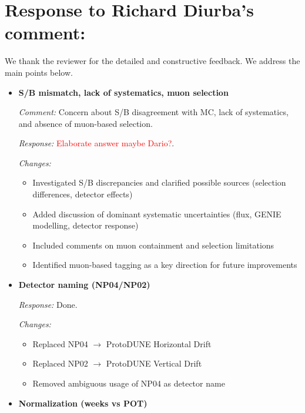 \documentclass[11pt]{article}
\begin{document}
\vspace{0.5cm}

\section*{Response to Richard Diurba's comment: }

We thank the reviewer for the detailed and constructive feedback. We address the main points below.

\vspace{0.3cm}

\begin{itemize}[leftmargin=*]

\item \textbf{S/B mismatch, lack of systematics, muon selection}

\textit{Comment:} Concern about S/B disagreement with MC, lack of systematics, and absence of muon-based selection.

\textit{Response:} \textcolor{red}{Elaborate answer maybe Dario?}.

\textit{Changes:}
\begin{itemize}
\item Investigated S/B discrepancies and clarified possible sources (selection differences, detector effects)
\item Added discussion of dominant systematic uncertainties (flux, GENIE modelling, detector response)
\item Included comments on muon containment and selection limitations
\item Identified muon-based tagging as a key direction for future improvements
\end{itemize}

\item \textbf{Detector naming (NP04/NP02)}

\textit{Response:} Done.

\textit{Changes:}
\begin{itemize}
\item Replaced NP04 $\rightarrow$ ProtoDUNE Horizontal Drift
\item Replaced NP02 $\rightarrow$ ProtoDUNE Vertical Drift
\item Removed ambiguous usage of NP04 as detector name
\end{itemize}

\item \textbf{Normalization (weeks vs POT)}


\end{itemize}
\end{document}
